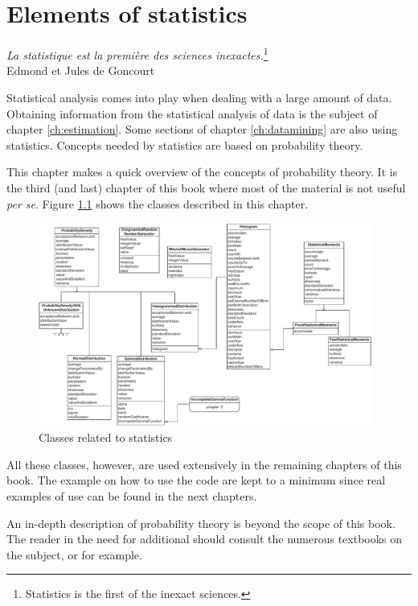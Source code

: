 \documentclass[twoside]{book}
\begin{document}
\fi

\chapter{Elements of statistics}
\label{ch:statistics} \vspace{1 ex}
\begin{flushright} {\sl La statistique est la premi\`ere des sciences inexactes.}\footnote{Statistics is the first of the inexact sciences.}\\
Edmond et Jules de Goncourt
\end{flushright}
\vspace{1 ex} Statistical analysis comes into play when dealing
with a large amount of data. Obtaining information from the
statistical analysis of data is the subject of chapter
\ref{ch:estimation}. Some sections of chapter \ref{ch:datamining}
are also using statistics. Concepts needed by statistics are based
on probability theory.

This chapter makes a quick overview of the concepts of probability
theory. It is the third (and last) chapter of this book where most
of the material is not useful {\it per se}. Figure
\ref{fig:statisticsclasses} shows the classes described in this
chapter.
\begin{figure}
\centering\includegraphics[width=11cm]{Figures/StatisticsClasses}
\caption{Classes related to statistics}
\label{fig:statisticsclasses}
\end{figure}
All these classes, however, are used extensively in the remaining
chapters of this book. The example on how to use the code are kept
to a minimum since real examples of use can be found in the next
chapters.

An in-depth description of probability theory is beyond the scope
of this book. The reader in the need for additional should consult
the numerous textbooks on the subject, \cite{PhiTay} or
\cite{LawKel} for example.
\end{document}
